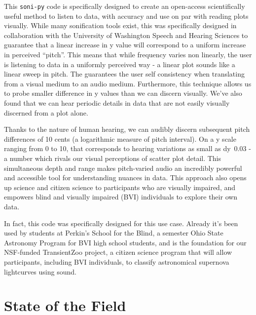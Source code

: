 \documentclass[]{acmsiggraph}
\begin{document}
This \texttt{soni-py} code is specifically designed to create an open-access scientifically useful method to listen to data, with accuracy and use on par with reading plots visually. While many sonification tools exist, this was specifically designed in collaboration with the University of Washington Speech and Hearing Sciences to guarantee that a linear increase in y value will correspond to a uniform increase in perceived “pitch”. This means that while frequency varies non linearly, the user is listening to data in a uniformly perceived way - a linear plot sounds like a linear sweep in pitch. The guarantees the user self consistency when translating from a visual medium to an audio medium. Furthermore, this technique allows us to probe smaller difference in y values than we can discern visually. We’ve also found that we can hear periodic details in data that are not easily visually discerned from a plot alone.

Thanks to the nature of human hearing, we can audibly discern subsequent pitch differences of 10 cents (a logarithmic measure of pitch interval). On a y scale ranging from 0 to 10, that corresponds to hearing variations as small as dy~0.03 - a number which rivals our visual perceptions of scatter plot detail. This simultaneous depth and range makes pitch-varied audio an incredibly powerful and accessible tool for understanding nuances in data. This approach also opens up science and citizen science to participants who are visually impaired, and empowers blind and visually impaired (BVI) individuals to explore their own data.

In fact, this code was specifically designed for this use case. Already it’s been used by students at Perkin’s School for the Blind, a semester Ohio State Astronomy Program for BVI high school students, and is the foundation for our NSF-funded TransientZoo project, a citizen science program that will allow participants, including BVI individuals, to classify astronomical supernova lightcurves using sound.

\section{State of the Field}

\end{document}
